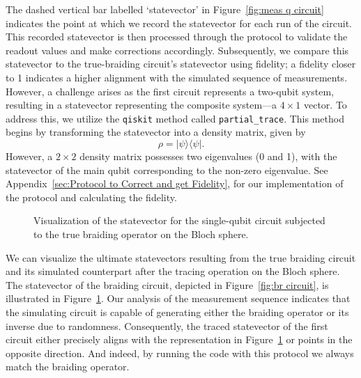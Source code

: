 \documentclass{article}
\begin{document}
The dashed vertical bar labelled `statevector' in Figure~\ref{fig:meas q circuit} indicates the point at which we record the statevector for each run of the circuit. This recorded statevector is then processed through the protocol to validate the readout values and make corrections accordingly. Subsequently, we compare this statevector to the true-braiding circuit's statevector using fidelity; a fidelity closer to 1 indicates a higher alignment with the simulated sequence of measurements. However, a challenge arises as the first circuit represents a two-qubit system, resulting in a statevector representing the composite system—a \(4 \times 1\) vector. To address this, we utilize the \texttt{qiskit} method called \texttt{partial\_trace}. This method begins by transforming the statevector into a density matrix, given by
\[\rho = | \psi \rangle \langle \psi | .\]
However, a \(2 \times 2\) density matrix possesses two eigenvalues (0 and 1), with the statevector of the main qubit corresponding to the non-zero eigenvalue. See Appendix~\ref{sec:Protocol to Correct and get Fidelity}, for our implementation of the protocol and calculating the fidelity.
\begin{figure}
	\begin{center}
		
	\end{center}
	\caption{Visualization of the statevector for the single-qubit circuit subjected to the true braiding operator on the Bloch sphere.}\label{fig:br in bloch}
\end{figure}
We can visualize the ultimate statevectors resulting from the true braiding circuit and its simulated counterpart after the tracing operation on the Bloch sphere. The statevector of the braiding circuit, depicted in Figure~\ref{fig:br circuit}, is illustrated in Figure~\ref{fig:br in bloch}. Our analysis of the measurement sequence indicates that the simulating circuit is capable of generating either the braiding operator or its inverse due to randomness. Consequently, the traced statevector of the first circuit either precisely aligns with the representation in Figure~\ref{fig:br in bloch} or points in the opposite direction. And indeed, by running the code with this protocol we always match the braiding operator.
\end{document}
